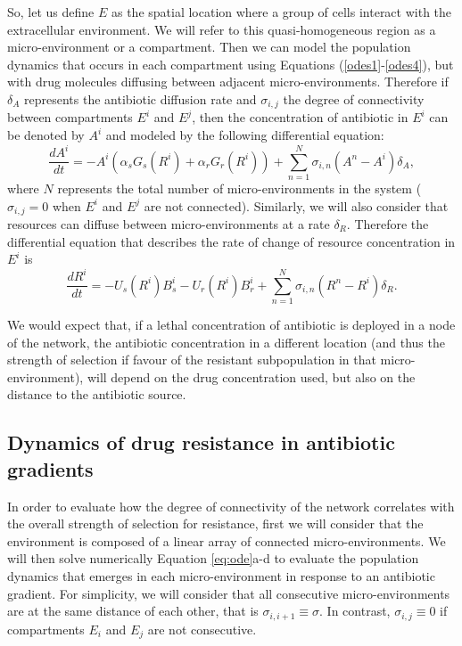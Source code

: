 \documentclass[fleqn,12pt]{wlscirep}
\begin{document}
So, let us define $E$ as the spatial location where a group of cells interact with the extracellular environment. We will refer to this quasi-homogeneous region as a micro-environment or a compartment.  
Then we can model the population dynamics that occurs in each compartment using Equations (\ref{odes1}-\ref{odes4}), but with drug molecules diffusing between adjacent micro-environments.  
Therefore if $\delta_A$ represents the antibiotic diffusion rate and $\sigma_{i,j}$ the degree of connectivity between compartments $E^i$ and $E^j$, then the concentration of antibiotic in $E^i$ can be denoted by $A^i$ and modeled by the following differential equation:
\begin{equation}
\frac{dA^i}{dt}= - A^i(\alpha_s G_s(R^i) + \alpha_r G_r(R^i)) + \sum_{n=1}^N \sigma_{i,n} (A^n-A^i)\delta_A,  \label{eq:odeA}
\end{equation}
where $N$ represents the total number of micro-environments in the system ($\sigma_{i,j}=0$ when $E^i$ and $E^j$ are not connected). Similarly, we will also consider that resources can diffuse between micro-environments at a rate $\delta_R$. Therefore the differential equation that describes the rate of change of resource concentration in $E^i$ is
\begin{equation}
\frac{dR^i}{dt}= -U_s(R^i)B_s^i-U_r(R^i)B_r^i   + \sum_{n=1}^N \sigma_{i,n} (R^n-R^i)\delta_R.\label{eq:odeR}
\end{equation}

We would expect that, if a lethal concentration of antibiotic is deployed in a node of the network, the antibiotic concentration in a different location (and thus the strength of selection if favour of the resistant subpopulation in that micro-environment), will depend on the drug concentration used, but also on the distance to the antibiotic source.  


\subsection*{Dynamics of drug resistance in antibiotic gradients}

In order to evaluate how the degree of connectivity of the network correlates with the overall strength of selection for resistance, first we will consider that the environment is composed of a linear array of connected micro-environments. We will then solve numerically Equation \ref{eq:ode}a-d to evaluate the population dynamics that emerges in each micro-environment in response to an antibiotic gradient.  For simplicity, we will consider that all consecutive micro-environments are at the same distance of each other, that is $\sigma_{i,i+1} \equiv \sigma$. In contrast, $\sigma_{i,j} \equiv 0$ if compartments $E_i$ and $E_j$ are not consecutive.
\end{document}
